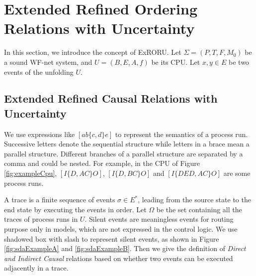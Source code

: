\documentclass{llncs}
\begin{document}

\section{Extended Refined Ordering Relations with Uncertainty}\label{sec:relations}
In this section, we introduce the concept of ExRORU. Let $\Sigma=(P,T,F,M_{0})$ be a sound WF-net system, and $U=(B,E,A,f)$ be its CPU. Let $x,y\in E$ be two events of the unfolding $U$.

\subsection{Extended Refined Causal Relations with Uncertainty}\label{subsec:causalAndInverseCausal}

We use expressions like $[ab\{c,d\}e]$ to represent the semantics of a process run. Successive letters denote the sequential structure while letters in a brace mean a parallel structure. Different branches of a parallel structure are separated by a comma and could be nested. For example, in the CPU of Figure \ref{fig:exampleCpu}, $[I\{D,AC\}O]$, $[I\{D,BC\}O]$ and $[I\{DED,AC\}O]$ are some process runs.

A trace is a finite sequence of events $\sigma\in E^{*}$, leading from the source state to the end state by executing the events in order. Let $\Omega$ be the set containing all the traces of process runs in $U$. Silent events are meaningless events for routing purpose only in models, which are not expressed in the control logic. We use shadowed box with slash to represent silent events, as shown in Figure \ref{fig:sdaExampleA} and \ref{fig:sdaExampleB}. Then we give the definition of \textit{Direct and Indirect Causal} relations based on whether two events can be executed adjacently in a trace.
\end{document}

